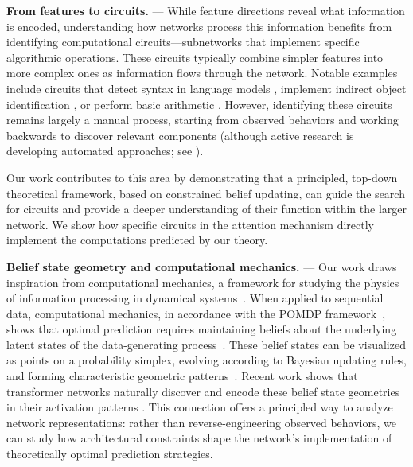 \textbf{From features to circuits.}
---
While feature directions reveal what information is encoded, understanding how networks process this information benefits from identifying computational circuits—subnetworks that implement specific algorithmic operations.
These circuits typically combine simpler features into more complex ones as information flows through the network.
Notable examples include circuits that detect syntax in language models \cite{elhage2021mathematical}, implement indirect object identification \cite{wang2022interpretability}, or perform basic arithmetic \cite{nanda2023mechanistic}.
However, identifying these circuits remains largely a manual process, starting from observed behaviors and working backwards to discover relevant components
(although active research is developing automated approaches; see \citet{conmy2023automatedcircuitdiscoverymechanistic, marks2024sparsefeaturecircuitsdiscovering}).

Our work contributes to this area by demonstrating that a principled, top-down theoretical framework, based on constrained belief updating, can guide the search for circuits and provide a deeper understanding of their function within the larger network. We show how specific circuits in the attention mechanism directly implement the computations predicted by our theory.

\textbf{Belief state geometry and computational mechanics.}
---
Our work draws inspiration from computational mechanics, a framework for studying the physics of information processing in dynamical systems~\cite{shalizi2001computational, Crutchfield12_Between, Riec18_SSAC1}. When applied to sequential data, computational mechanics, in accordance with the POMDP framework~\cite{Kaelbling98_Planning}, 
shows that optimal prediction requires maintaining beliefs about the underlying latent states of the data-generating process~\cite{Upper97_Theory}. 
These belief states can be visualized as points on a probability simplex, evolving according to Bayesian updating rules, and forming characteristic geometric patterns~\cite{Crutchfield94_Calculi, Marzen_2017}.
Recent work shows that transformer networks naturally discover and encode these belief state geometries in their activation patterns \cite{shai2024transformersrepresentbeliefstate}.
This connection offers a principled way to analyze network representations: rather than reverse-engineering observed behaviors, we can study how architectural constraints shape the network's implementation of theoretically optimal prediction strategies.

